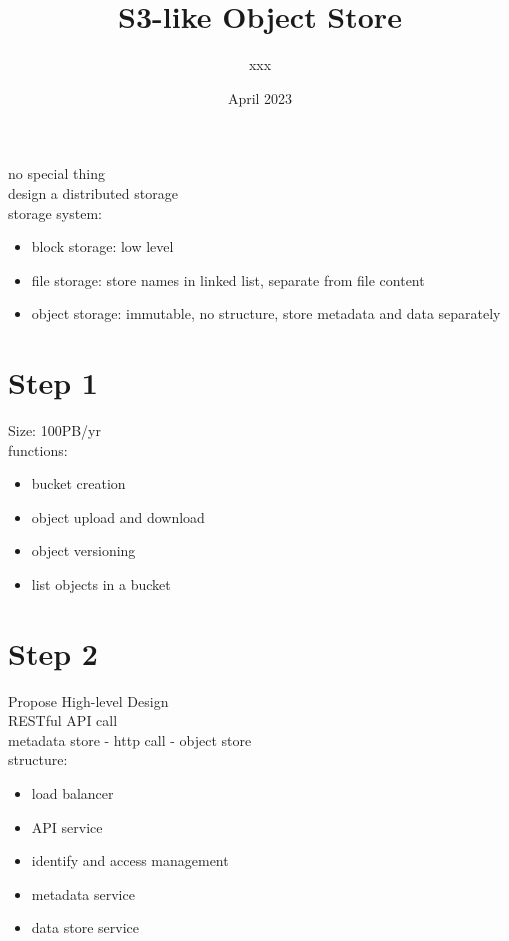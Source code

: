 \documentclass{article}
\title{S3-like Object Store}
\author{xxx}
\date{April 2023}
\begin{document}
\maketitle
no special thing\\
design a distributed storage\\
storage system:
\begin{itemize}
    \item block storage: low level
    \item file storage: store names in linked list, separate from file content
    \item object storage: immutable, no structure, store metadata and data separately
\end{itemize}
\section{Step 1}
Size: 100PB/yr\\
functions:\\
\begin{itemize}
    \item bucket creation
    \item object upload and download
    \item object versioning
    \item list objects in a bucket
\end{itemize}
\section{Step 2}
Propose High-level Design\\
RESTful API call\\
metadata store - http call - object store\\
structure:
\begin{itemize}
    \item load balancer
    \item API service
    \item identify and access management
    \item metadata service
    \item data store service
\end{itemize}
\end{document}
